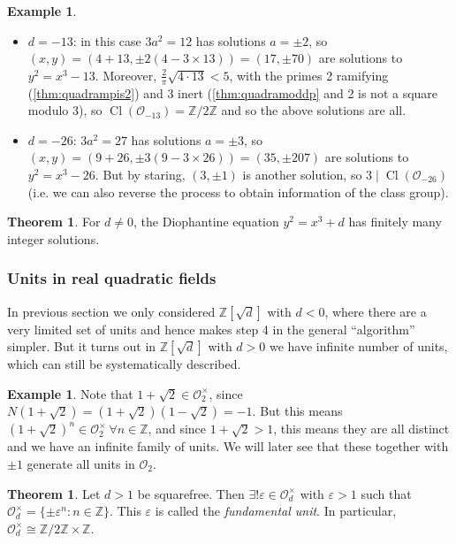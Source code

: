 \documentclass{article}
\newcommand{\Z}{\mathbb{Z}}
\newcommand{\Cl}{\operatorname{Cl}}
\newcommand{\ri}{\mathcal{O}}
\theoremstyle{definition}
\newtheorem{thm}[defn]{Theorem}
\newtheorem{example}[defn]{Example}
\begin{document}
\begin{example}
\label{example:mordell}
\begin{itemize}
\item $d=-13$: in this case $3a^2=12$ has solutions $a=\pm 2$, so $(x,y)=\left(4+13,\pm 2\left(4-3\times 13\right)\right)=(17,\pm 70)$ are solutions to $y^2=x^3-13$. Moreover, $\frac{2}{\pi}\sqrt{4\cdot 13}<5$, with the primes 2 ramifying (\ref{thm:quadrampis2}) and 3 inert (\ref{thm:quadramoddp} and 2 is not a square modulo 3), so $\Cl(\ri_{-13})=\Z/2\Z$ and so the above solutions are all.
\item $d=-26$: $3a^2=27$ has solutions $a=\pm 3$, so $(x,y)=\left(9+26,\pm 3\left(9-3\times 26\right)\right)=(35,\pm 207)$ are solutions to $y^2=x^3-26$. But by staring, $(3,\pm 1)$ is another solution, so $3\mid\Cl(\ri_{-26})$ (i.e. we can also reverse the process to obtain information of the class group).
\end{itemize}
\end{example}

\begin{thm}
For $d\neq 0$, the Diophantine equation $y^2=x^3+d$ has finitely many integer solutions.
\end{thm}

\subsubsection{Units in real quadratic fields}
In previous section we only considered $\Z\left[\sqrt d\right]$ with $d<0$, where there are a very limited set of units and hence makes step 4 in the general ``algorithm'' simpler. But it turns out in $\Z\left[\sqrt d\right]$ with $d>0$ we have infinite number of units, which can still be systematically described.

\begin{example}
Note that $1+\sqrt{2}\in\ri_2^\times$, since $N\left(1+\sqrt 2\right)=\left(1+\sqrt 2\right)\left(1-\sqrt{2}\right)=-1$. But this means $\left(1+\sqrt{2}\right)^n\in\ri_2^\times \ \forall n\in\Z$, and since $1+\sqrt 2>1$, this means they are all distinct and we have an infinite family of units. We will later see that these together with $\pm 1$ generate all units in $\ri_2$.
\end{example}

\begin{thm}
\label{thm:fundamentalunit}
Let $d>1$ be squarefree. Then $\exists!\varepsilon\in\ri_d^\times$ with $\varepsilon>1$ such that $\ri_d^\times=\{\pm\varepsilon^n:n\in\Z\}$. This $\varepsilon$ is called the \textit{fundamental unit}. In particular, $\ri_d^\times\cong\Z/2\Z\times\Z$.
\end{thm}
\end{document}
